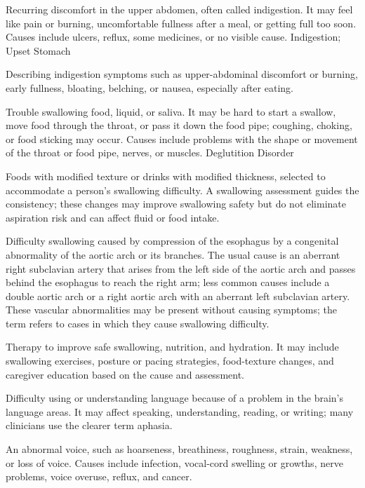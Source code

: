  Recurring discomfort in the upper abdomen, often called indigestion. It may feel like pain or burning, uncomfortable fullness after a meal, or getting full too soon. Causes include ulcers, reflux, some medicines, or no visible cause.
\synonyms
Indigestion; Upset Stomach


 Describing indigestion symptoms such as upper-abdominal discomfort or burning, early fullness, bloating, belching, or nausea, especially after eating.

 Trouble swallowing food, liquid, or saliva. It may be hard to start a swallow, move food through the throat, or pass it down the food pipe; coughing, choking, or food sticking may occur. Causes include problems with the shape or movement of the throat or food pipe, nerves, or muscles.
\synonyms
Deglutition Disorder


 Foods with modified texture or drinks with modified thickness, selected to accommodate a person's swallowing difficulty. A swallowing assessment guides the consistency; these changes may improve swallowing safety but do not eliminate aspiration risk and can affect fluid or food intake.

 Difficulty swallowing caused by compression of the esophagus by a congenital abnormality of the aortic arch or its branches. The usual cause is an aberrant right subclavian artery that arises from the left side of the aortic arch and passes behind the esophagus to reach the right arm; less common causes include a double aortic arch or a right aortic arch with an aberrant left subclavian artery. These vascular abnormalities may be present without causing symptoms; the term refers to cases in which they cause swallowing difficulty.

 Therapy to improve safe swallowing, nutrition, and hydration. It may include swallowing exercises, posture or pacing strategies, food-texture changes, and caregiver education based on the cause and assessment.

 Difficulty using or understanding language because of a problem in the brain's language areas. It may affect speaking, understanding, reading, or writing; many clinicians use the clearer term aphasia.

 An abnormal voice, such as hoarseness, breathiness, roughness, strain, weakness, or loss of voice. Causes include infection, vocal-cord swelling or growths, nerve problems, voice overuse, reflux, and cancer.

